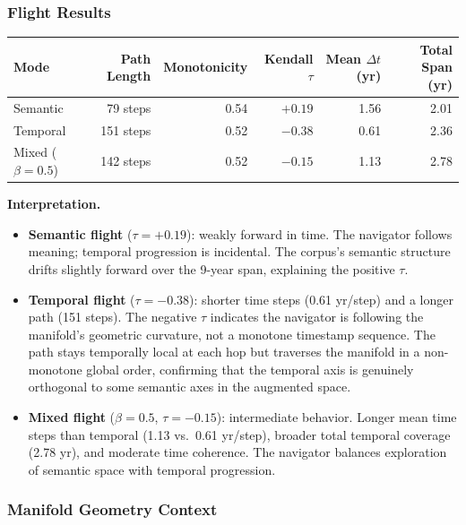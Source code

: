 \documentclass[12pt,letterpaper]{article}
\begin{document}
\subsubsection{Flight Results}

\begin{center}
\begin{tabular}{lrrrrr}
  \toprule
  \textbf{Mode} & \textbf{Path Length} & \textbf{Monotonicity} &
  \textbf{Kendall $\tau$} & \textbf{Mean $\Delta t$ (yr)} & \textbf{Total Span (yr)} \\
  \midrule
  Semantic                 & 79 steps  & 0.54 & $+0.19$ & 1.56 & 2.01 \\
  Temporal                 & 151 steps & 0.52 & $-0.38$ & 0.61 & 2.36 \\
  Mixed ($\beta = 0.5$)    & 142 steps & 0.52 & $-0.15$ & 1.13 & 2.78 \\
  \bottomrule
\end{tabular}
\end{center}

\textbf{Interpretation.}

\begin{itemize}
  \item \textbf{Semantic flight} ($\tau = +0.19$): weakly forward in time.
    The navigator follows meaning; temporal progression is incidental. The
    corpus's semantic structure drifts slightly forward over the 9-year span,
    explaining the positive $\tau$.

  \item \textbf{Temporal flight} ($\tau = -0.38$): shorter time steps (0.61
    yr/step) and a longer path (151 steps). The negative $\tau$ indicates
    the navigator is following the manifold's geometric curvature, not a
    monotone timestamp sequence. The path stays temporally local at each hop
    but traverses the manifold in a non-monotone global order, confirming
    that the temporal axis is genuinely orthogonal to some semantic axes in
    the augmented space.

  \item \textbf{Mixed flight} ($\beta = 0.5$, $\tau = -0.15$): intermediate
    behavior. Longer mean time steps than temporal (1.13 vs.\ 0.61 yr/step),
    broader total temporal coverage (2.78 yr), and moderate time coherence.
    The navigator balances exploration of semantic space with temporal
    progression.
\end{itemize}

\subsubsection{Manifold Geometry Context}
\end{document}
